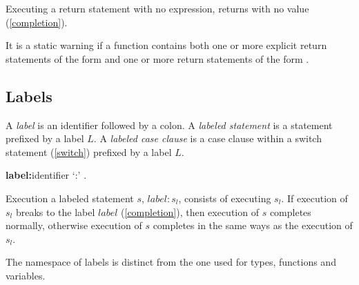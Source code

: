 \documentclass{article}
\begin{document}



\LMHash{}
Executing a return statement with no expression, \code{\RETURN;} returns with no value (\ref{completion}).

\LMHash{}
It is a static warning if a function contains both one or more explicit return statements of the form \code{\RETURN;} and one or more return statements of the form .


\subsection{Labels}

\LMHash{}
A {\em label} is an identifier followed by a colon.
A {\em labeled statement} is a statement prefixed by a label $L$.
A {\em labeled case clause} is a case clause within a switch statement (\ref{switch}) prefixed by a label $L$.


\begin{grammar}
{\bf label:}identifier `{\escapegrammar :}'
  .
\end{grammar}

\LMHash{}
Execution a labeled statement $s$, $label: s_l$, consists of executing $s_l$.
If execution of $s_l$ breaks to the label $label$ (\ref{completion}),
then execution of $s$ completes normally,
otherwise execution of $s$ completes in the same ways as the execution of $s_l$.

\LMHash{}
The namespace of labels is distinct from the one used for types, functions and variables.
\end{document}
